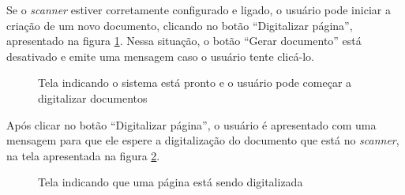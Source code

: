 Se o {\it scanner} estiver corretamente configurado e ligado, o usuário pode iniciar a criação de um novo documento, clicando no botão ``Digitalizar página'', apresentado na figura \ref{fig:dig_3}. Nessa situação, o botão ``Gerar documento'' está desativado e emite uma mensagem caso o usuário tente clicá-lo.

\begin{figure}[h]
 \centering
    \setlength\fboxsep{0pt}
    \setlength\fboxrule{0.5pt}
  \caption {Tela indicando o sistema está pronto e o usuário pode começar a digitalizar documentos}
  \label{fig:dig_3}
\end{figure}

Após clicar no botão ``Digitalizar página'', o usuário é apresentado com uma mensagem para que ele espere a digitalização do documento que está no {\it scanner}, na tela apresentada na figura \ref{fig:dig_4}.

\begin{figure}[h]
 \centering
    \setlength\fboxsep{0pt}
    \setlength\fboxrule{0.5pt}
  \caption {Tela indicando que uma página está sendo digitalizada}
  \label{fig:dig_4}
\end{figure}

